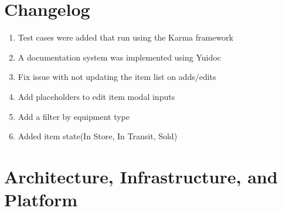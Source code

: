 \documentclass[letterpaper, 12pt]{article}
\begin{document}
\section{Changelog}
\begin{enumerate}
\item Test cases were added that run using the Karma framework
\item A documentation system was implemented using Yuidoc
\item Fix issue with not updating the item list on adds/edits
\item Add placeholders to edit item modal inputs
\item Add a filter by equipment type
\item Added item state(In Store, In Transit, Sold)
\end{enumerate}

\section{Architecture, Infrastructure, and Platform}
\end{document}
